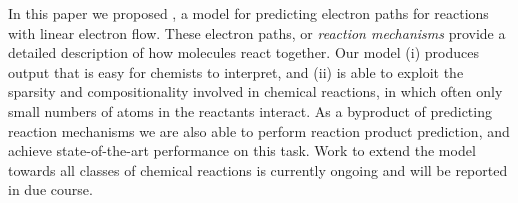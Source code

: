 
In this paper we proposed \ourModel, a model for predicting electron paths for reactions with linear electron flow.
These electron paths, or {\em reaction mechanisms} provide a detailed description of how molecules react together. 
Our model (i) produces output that is easy for chemists to interpret, and (ii) is able to exploit the sparsity and compositionality involved in chemical reactions, in which often only small numbers of atoms in the reactants interact.
As a byproduct of predicting reaction mechanisms we are also able to perform reaction product prediction,
 and achieve state-of-the-art performance on this task. 
 Work to extend the model towards all classes of chemical reactions is currently ongoing and will be reported in due course.
%
%
%
%
%


